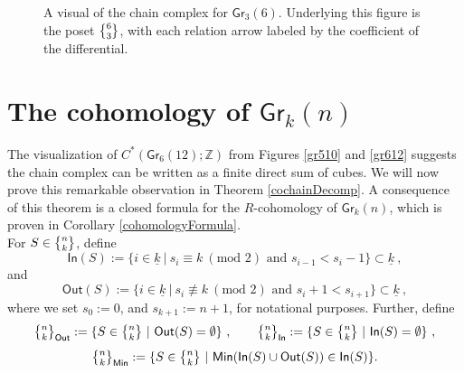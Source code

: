 \documentclass{article}
\newcommand{\bb}[1]{\mathbb{#1}}
\newcommand{\msf}[1]{\mathsf{#1}}
\newcommand{\gr}{\msf{Gr}}
\newcommand{\nchoosek}{\textstyle\genfrac{\lbrace}{\rbrace}{0pt}{}}
\newcommand{\ul}[1]{\underline{#1}}
\newcommand{\In}{\msf{In}}
\newcommand{\Out}{\msf{Out}}
\theoremstyle{definition}
\begin{document}
\begin{figure}
\begin{small}\begin{center}
\end{center}\end{small}
\caption{A visual of the chain complex for $\gr_3(6)$. Underlying this figure is the poset $\nchoosek{6}{3}$,
with each relation arrow labeled by the coefficient of the differential.}
\label{posetCoho}
\end{figure}























\section{The cohomology of $\gr_k(n)$}\label{sec:cohomology}
The visualization of $C^\ast(\gr_6(12); \bb{Z})$ from Figures \ref{gr510} and \ref{gr612} suggests the chain complex
can be written as a finite direct sum of cubes. 
We will now prove this remarkable observation in Theorem \ref{cochainDecomp}.
A consequence of this theorem is a closed formula for the $R$-cohomology of $\gr_k(n)$,
which is proven in Corollary \ref{cohomologyFormula}. \\

For $S \in \nchoosek{n}{k}$, define
$$\msf{In}(S):= \{i \in \ul{k} ~|~ s_i \equiv k~(\text{mod } 2) \text{ and } s_{i-1} < s_i-1 \} \subset \ul{k}~,$$
and
$$\msf{Out}(S) :=\{i \in \ul{k} ~|~ s_i \not\equiv k ~(\text{mod } 2) \text{ and } s_i+1 < s_{i+1} \} \subset \ul{k}~,$$
where we set $s_0:=0$, and $s_{k+1}:=n+1$, for notational purposes. Further, define
$$\nchoosek{n}{k}_\msf{Out} := \{S \in \nchoosek{n}{k} ~|~ \msf{Out}(S) = \emptyset\}~, 
    \qquad \nchoosek{n}{k}_\msf{In} := \{S \in \nchoosek{n}{k} ~|~ \msf{In}(S) = \emptyset\}~,$$
$$\nchoosek{n}{k}_\msf{Min} := \{S \in \nchoosek{n}{k} ~|~ \msf{Min}(\In(S) \cup \Out(S)) \in \In(S)\}.$$
\end{document}
